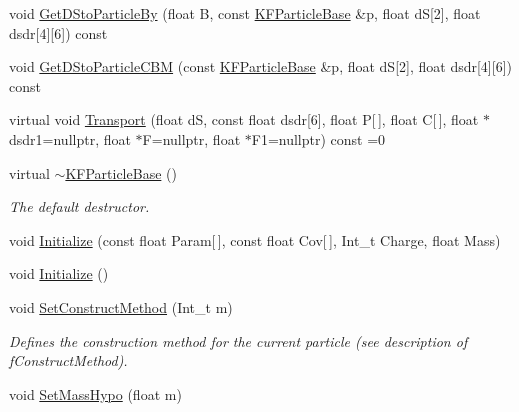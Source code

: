 \begin{DoxyCompactItemize}
\item 
void \hyperlink{classKFParticleBase_adc56a774e8b806e9d7f0202d66d9e706}{Get\+D\+Sto\+Particle\+By} (float B, const \hyperlink{classKFParticleBase}{K\+F\+Particle\+Base} \&p, float dS\mbox{[}2\mbox{]}, float dsdr\mbox{[}4\mbox{]}\mbox{[}6\mbox{]}) const 
\item 
void \hyperlink{classKFParticleBase_a8a48edc283143f590c86a970c5df5d5c}{Get\+D\+Sto\+Particle\+C\+BM} (const \hyperlink{classKFParticleBase}{K\+F\+Particle\+Base} \&p, float dS\mbox{[}2\mbox{]}, float dsdr\mbox{[}4\mbox{]}\mbox{[}6\mbox{]}) const 
\item 
virtual void \hyperlink{classKFParticleBase_a82e0481fd804e1a2f4e87ab4d93761c9}{Transport} (float dS, const float dsdr\mbox{[}6\mbox{]}, float P\mbox{[}$\,$\mbox{]}, float C\mbox{[}$\,$\mbox{]}, float $\ast$dsdr1=nullptr, float $\ast$F=nullptr, float $\ast$F1=nullptr) const =0
\item 
virtual \hyperlink{classKFParticleBase_a53ab5233995bbc10fb2469fa4e2629e7}{$\sim$\+K\+F\+Particle\+Base} ()\hypertarget{classKFParticleBase_a53ab5233995bbc10fb2469fa4e2629e7}{}\label{classKFParticleBase_a53ab5233995bbc10fb2469fa4e2629e7}

\begin{DoxyCompactList}\small\item\em The default destructor. \end{DoxyCompactList}\item 
void \hyperlink{classKFParticleBase_a69c1005c0a85d378ca492e9140009ad1}{Initialize} (const float Param\mbox{[}$\,$\mbox{]}, const float Cov\mbox{[}$\,$\mbox{]}, Int\+\_\+t Charge, float Mass)
\item 
void \hyperlink{classKFParticleBase_a2957ab78bcb45b327959f331125e7e4a}{Initialize} ()
\item 
void \hyperlink{classKFParticleBase_a98469b9eda5343b342cfb8b2287d77bf}{Set\+Construct\+Method} (Int\+\_\+t m)\hypertarget{classKFParticleBase_a98469b9eda5343b342cfb8b2287d77bf}{}\label{classKFParticleBase_a98469b9eda5343b342cfb8b2287d77bf}

\begin{DoxyCompactList}\small\item\em Defines the construction method for the current particle (see description of f\+Construct\+Method). \end{DoxyCompactList}\item 
void \hyperlink{classKFParticleBase_a1a795bc0368ef03e7934bd8a6d4e6de4}{Set\+Mass\+Hypo} (float m)\hypertarget{classKFParticleBase_a1a795bc0368ef03e7934bd8a6d4e6de4}{}\label{classKFParticleBase_a1a795bc0368ef03e7934bd8a6d4e6de4}


\end{DoxyCompactItemize}
